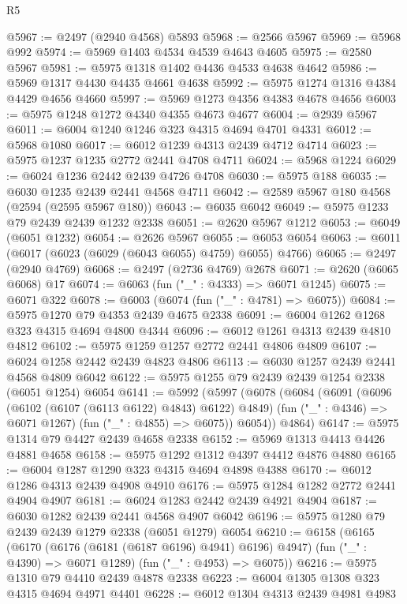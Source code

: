 \begin{lexlean}{R5}
\begin{coremodule}
@5967 := @2497 (@2940 @4568) @5893
@5968 := @2566 @5967
@5969 := @5968 @992
@5974 := @5969 @1403 @4534 @4539 @4643 @4605
@5975 := @2580 @5967
@5981 := @5975 @1318 @1402 @4436 @4533 @4638 @4642
@5986 := @5969 @1317 @4430 @4435 @4661 @4638
@5992 := @5975 @1274 @1316 @4384 @4429 @4656 @4660
@5997 := @5969 @1273 @4356 @4383 @4678 @4656
@6003 := @5975 @1248 @1272 @4340 @4355 @4673 @4677
@6004 := @2939 @5967
@6011 := @6004 @1240 @1246 @323 @4315 @4694 @4701 @4331
@6012 := @5968 @1080
@6017 := @6012 @1239 @4313 @2439 @4712 @4714
@6023 := @5975 @1237 @1235 @2772 @2441 @4708 @4711
@6024 := @5968 @1224
@6029 := @6024 @1236 @2442 @2439 @4726 @4708
@6030 := @5975 @188
@6035 := @6030 @1235 @2439 @2441 @4568 @4711
@6042 := @2589 @5967 @180 @4568 (@2594 (@2595 @5967 @180))
@6043 := @6035 @6042
@6049 := @5975 @1233 @79 @2439 @2439 @1232 @2338
@6051 := @2620 @5967 @1212
@6053 := @6049 (@6051 @1232)
@6054 := @2626 @5967
@6055 := @6053 @6054
@6063 := @6011 (@6017 (@6023 (@6029 (@6043 @6055) @4759) @6055) @4766)
@6065 := @2497 (@2940 @4769)
@6068 := @2497 (@2736 @4769) @2678
@6071 := @2620 (@6065 @6068) @17
@6074 := @6063 (fun ("_" : @4333) => @6071 @1245)
@6075 := @6071 @322
@6078 := @6003 (@6074 (fun ("_" : @4781) => @6075))
@6084 := @5975 @1270 @79 @4353 @2439 @4675 @2338
@6091 := @6004 @1262 @1268 @323 @4315 @4694 @4800 @4344
@6096 := @6012 @1261 @4313 @2439 @4810 @4812
@6102 := @5975 @1259 @1257 @2772 @2441 @4806 @4809
@6107 := @6024 @1258 @2442 @2439 @4823 @4806
@6113 := @6030 @1257 @2439 @2441 @4568 @4809 @6042
@6122 := @5975 @1255 @79 @2439 @2439 @1254 @2338 (@6051 @1254) @6054
@6141 := @5992
    (@5997
      (@6078
        (@6084
          (@6091
            (@6096 (@6102 (@6107 (@6113 @6122) @4843) @6122) @4849)
            (fun ("_" : @4346) => @6071 @1267)
            (fun ("_" : @4855) => @6075))
          @6054))
      @4864)
@6147 := @5975 @1314 @79 @4427 @2439 @4658 @2338
@6152 := @5969 @1313 @4413 @4426 @4881 @4658
@6158 := @5975 @1292 @1312 @4397 @4412 @4876 @4880
@6165 := @6004 @1287 @1290 @323 @4315 @4694 @4898 @4388
@6170 := @6012 @1286 @4313 @2439 @4908 @4910
@6176 := @5975 @1284 @1282 @2772 @2441 @4904 @4907
@6181 := @6024 @1283 @2442 @2439 @4921 @4904
@6187 := @6030 @1282 @2439 @2441 @4568 @4907 @6042
@6196 := @5975 @1280 @79 @2439 @2439 @1279 @2338 (@6051 @1279) @6054
@6210 := @6158
    (@6165
      (@6170 (@6176 (@6181 (@6187 @6196) @4941) @6196) @4947)
      (fun ("_" : @4390) => @6071 @1289)
      (fun ("_" : @4953) => @6075))
@6216 := @5975 @1310 @79 @4410 @2439 @4878 @2338
@6223 := @6004 @1305 @1308 @323 @4315 @4694 @4971 @4401
@6228 := @6012 @1304 @4313 @2439 @4981 @4983

\end{coremodule}
\end{lexlean}
